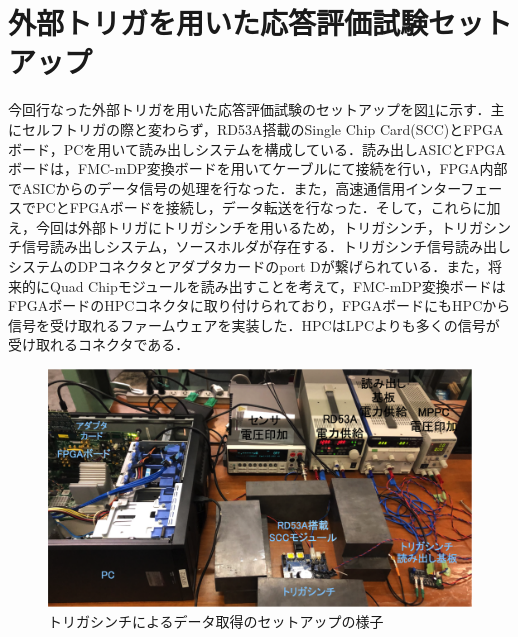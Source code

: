 

\section{外部トリガを用いた応答評価試験セットアップ}
\label{sec:extsetup}
今回行なった外部トリガを用いた応答評価試験のセットアップを図\ref{fig:extsetup}に示す．主にセルフトリガの際と変わらず，RD53A搭載のSingle Chip Card(SCC)とFPGAボード，PCを用いて読み出しシステムを構成している．読み出しASICとFPGAボードは，FMC-mDP変換ボードを用いてケーブルにて接続を行い，FPGA内部でASICからのデータ信号の処理を行なった．また，高速通信用インターフェースでPCとFPGAボードを接続し，データ転送を行なった．そして，これらに加え，今回は外部トリガにトリガシンチを用いるため，トリガシンチ，トリガシンチ信号読み出しシステム，ソースホルダが存在する．トリガシンチ信号読み出しシステムのDPコネクタとアダプタカードのport Dが繋げられている．また，将来的にQuad Chipモジュールを読み出すことを考えて，FMC-mDP変換ボードはFPGAボードのHPCコネクタに取り付けられており，FPGAボードにもHPCから信号を受け取れるファームウェアを実装した．HPCはLPCよりも多くの信号が受け取れるコネクタである．\par

\begin{figure}[h]
  \centering
  \includegraphics[width=15cm]{./figure/extsetup.png}
  \caption{トリガシンチによるデータ取得のセットアップの様子}
  \label{fig:extsetup}
\end{figure}

